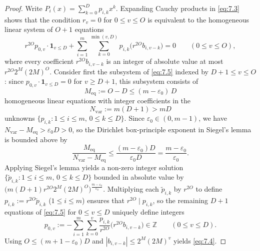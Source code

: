 \documentclass[11pt,reqno]{amsart}
\theoremstyle{remark}
\numberwithin{equation}{section}
\newcommand{\Z}{\mathbb{Z}}
\begin{document}
\begin{proof}
Write $P_i(x) = \sum_{k=0}^D p_{i,k} x^k$. Expanding Cauchy products in \eqref{eq:7.3} shows that the condition $r_v = 0$ for $0 \le v \le O$ is equivalent to the homogeneous linear system of $O + 1$ equations
\begin{equation}\label{eq:7.5}
r^{2O} p_{0,v} \cdot \mathbf{1}_{v \le D} + \sum_{i=1}^m \sum_{k=0}^{\min(v,D)} p_{i,k}\bigl(r^{2O} b_{i,v-k}\bigr) = 0 \qquad (0 \le v \le O),
\end{equation}
where every coefficient $r^{2O} b_{i,v-k}$ is an integer of absolute value at most $r^{2O} 2^M (2M)^O$. Consider first the subsystem of \eqref{eq:7.5} indexed by $D + 1 \le v \le O$: since $p_{0,v} \cdot \mathbf{1}_{v \le D} = 0$ for $v \ge D + 1$, this subsystem consists of
\[
M_{\mathrm{eq}} := O - D \le (m - \varepsilon_0)\,D
\]
homogeneous linear equations with integer coefficients in the
\[
N_{\mathrm{var}} := m(D + 1) > mD
\]
unknowns $\{p_{i,k} : 1 \le i \le m,\, 0 \le k \le D\}$. Since $\varepsilon_0 \in (0, m - 1)$, we have $N_{\mathrm{var}} - M_{\mathrm{eq}} > \varepsilon_0 D > 0$, so the Dirichlet box-principle exponent in Siegel's lemma \cite[Lemma~4.3]{BuiPrattZaharescu2023} is bounded above by
\[
\frac{M_{\mathrm{eq}}}{N_{\mathrm{var}} - M_{\mathrm{eq}}} \le \frac{(m - \varepsilon_0)D}{\varepsilon_0 D} = \frac{m - \varepsilon_0}{\varepsilon_0}.
\]
Applying Siegel's lemma yields a non-zero integer solution $\{\tilde{p}_{i,k} : 1 \le i \le m,\, 0 \le k \le D\}$ bounded in absolute value by $\bigl(m(D + 1)r^{2O} 2^M (2M)^O\bigr)^{\frac{m-\varepsilon_0}{\varepsilon_0}}$. Multiplying each $\tilde{p}_{i,k}$ by $r^{2O}$ to define $p_{i,k} := r^{2O}\tilde{p}_{i,k}$ ($1 \le i \le m$) ensures that $r^{2O} \mid p_{i,k}$, so the remaining $D + 1$ equations of \eqref{eq:7.5} for $0 \le v \le D$ uniquely define integers
\[
p_{0,v} := -\sum_{i=1}^m \sum_{k=0}^v \frac{p_{i,k}}{r^{2O}}\bigl(r^{2O} b_{i,v-k}\bigr) \in \Z \qquad (0 \le v \le D).
\]
Using $O \le (m + 1 - \varepsilon_0)D$ and $|b_{i,v-k}| \le 2^M(2M)^v$ yields \eqref{eq:7.4}.
\end{proof}
\end{document}
